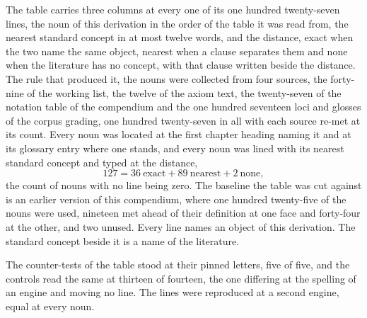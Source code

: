 \begin{chproof}[instrument]
The table carries three columns at every one of its one hundred twenty-seven lines, the noun of this derivation in the order of the table it was read from, the nearest standard concept in at most twelve words, and the distance, exact when the two name the same object, nearest when a clause separates them and none when the literature has no concept, with that clause written beside the distance. The rule that produced it, the nouns were collected from four sources, the forty-nine of the working list, the twelve of the axiom text, the twenty-seven of the notation table of the compendium and the one hundred seventeen loci and glosses of the corpus grading, one hundred twenty-seven in all with each source re-met at its count. Every noun was located at the first chapter heading naming it and at its glossary entry where one stands, and every noun was lined with its nearest standard concept and typed at the distance,
\begin{equation}
127 = 36 \ \text{exact} + 89 \ \text{nearest} + 2 \ \text{none} ,
\end{equation}
the count of nouns with no line being zero. The baseline the table was cut against is an earlier version of this compendium, where one hundred twenty-five of the nouns were used, nineteen met ahead of their definition at one face and forty-four at the other, and two unused. Every line names an object of this derivation. The standard concept beside it is a name of the literature.

The counter-tests of the table stood at their pinned letters, five of five, and the controls read the same at thirteen of fourteen, the one differing at the spelling of an engine and moving no line. The lines were reproduced at a second engine, equal at every noun.
\end{chproof}

